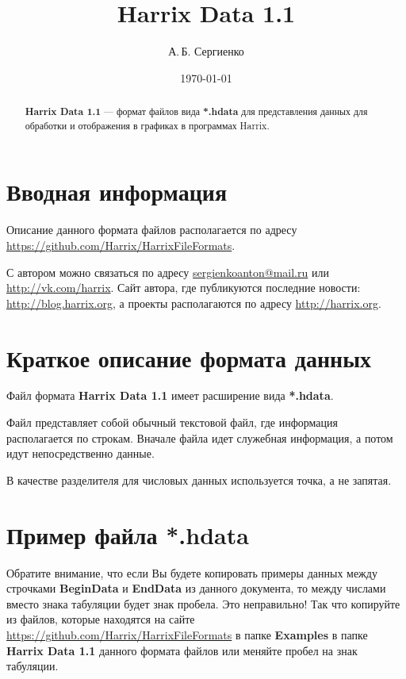 \documentclass[a4paper,12pt]{article}
\title{Harrix Data 1.1}
\author{А.\,Б. Сергиенко}
\date{\today}
\begin{document}


\maketitle

\begin{abstract}
\textbf{Harrix Data 1.1} --- формат файлов вида \textbf{*.hdata} для представления данных для обработки и отображения в графиках в программах Harrix.
\end{abstract}

\tableofcontents

\newpage

\section{Вводная информация}

Описание данного формата файлов располагается по адресу \href {https://github.com/Harrix/HarrixFileFormats} {https://github.com/Harrix/HarrixFileFormats}.

С автором можно связаться по адресу \href {mailto:sergienkoanton@mail.ru} {sergienkoanton@mail.ru} или  \href {http://vk.com/harrix} {http://vk.com/harrix}. Сайт автора, где публикуются последние новости: \href {http://blog.harrix.org} {http://blog.harrix.org}, а проекты располагаются по адресу \href {http://harrix.org} {http://harrix.org}.


\section{Краткое описание формата данных}

Файл формата \textbf{Harrix Data 1.1} имеет расширение вида \textbf{*.hdata}.

Файл представляет собой обычный текстовой файл, где информация располагается по строкам. Вначале файла идет служебная информация, а потом идут непосредственно данные.

В качестве разделителя для числовых данных используется точка, а не запятая.

\section{Пример файла *.hdata}

Обратите внимание, что если Вы будете копировать примеры данных между строчками \textbf{BeginData} и \textbf{EndData} из данного документа, то между числами вместо знака табуляции будет знак пробела. Это неправильно! Так что копируйте из файлов, которые находятся на сайте \href {https://github.com/Harrix/HarrixFileFormats} {https://github.com/Harrix/HarrixFileFormats} в папке \textbf{Examples} в папке \textbf{Harrix Data 1.1} данного формата файлов или меняйте пробел на знак табуляции.
\end{document}
